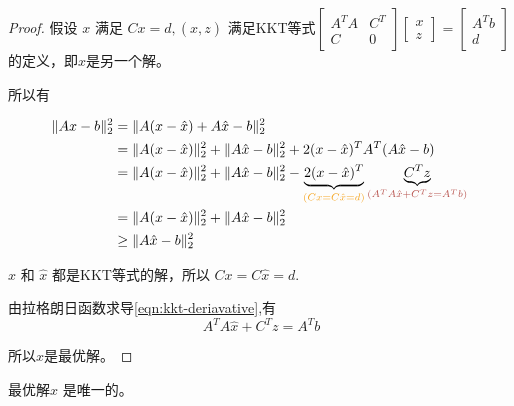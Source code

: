 \begin{proof}
    假设 $ x $ 满足 $ C x=d,(\hat{x}, z) $ 满足KKT等式$ \left[\begin{array}{cc}A^{T} A & C^{T} \\ {C} & 0\end{array}\right]\left[\begin{array}{l}x \\ z\end{array}\right]=\left[\begin{array}{l}A^{T} b \\ d\end{array}\right] $的定义，即$x$是另一个解。

    所以有

    \begin{equation}\begin{aligned}
        \| Ax-b\| _{2}^{2} & =\| A(x-\hat{x} )+A\hat{x} -b\| _{2}^{2}\\
         & =\| A(x-\hat{x} )\| _{2}^{2} +\| A\hat{x} -b\| _{2}^{2} +2(x-\hat{x} )^{T} A^{T} (A\hat{x} -b)\\
         & =\| A(x-\hat{x} )\| _{2}^{2} +\| A\hat{x} -b\| _{2}^{2} -\underbrace{2(x-\hat{x} )^{T}}_{\textcolor[rgb]{0.96,0.65,0.14}{(Cx=C\hat{x} =d)}}\underbrace{C^{T} z}_{\textcolor[rgb]{0.72,0.33,0.31}{ \left( A^{T} A\hat{x} +C^{T} z=A^{T} b\right)}}\\
         & =\| A(x-\hat{x} )\| _{2}^{2} +\| A\hat{x} -b\| _{2}^{2}\\
         & \geq \| A\hat{x} -b\| _{2}^{2}
        \end{aligned}\end{equation}

    \begin{remark}
        $x$ 和 $\hat{x}$ 都是KKT等式的解，所以 $Cx = C \hat{x} = d$.

        由拉格朗日函数求导\ref{eqn:kkt-deriavative},有
        \begin{equation}\ A^{T} A\hat{x} +C^{T} z=A^{T} b\end{equation}
        
    \end{remark}

        所以$\hat{x}$是最优解。
\end{proof}

\begin{theorem}[KKT等式最优解的唯一性]
    最优解$ \hat{x} $ 是唯一的。
\end{theorem}

